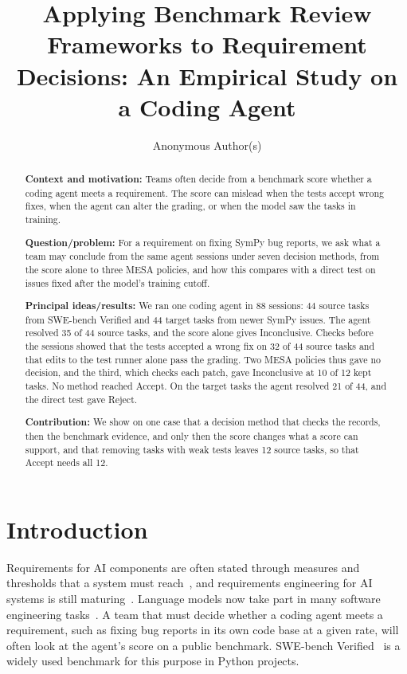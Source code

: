 \documentclass[runningheads]{llncs}
\title{Applying Benchmark Review Frameworks to Requirement Decisions: An Empirical Study on a Coding Agent}
\author{Anonymous Author(s)}
\institute{Submission Under Double-Blind Review}
\begin{document}
\maketitle

\begin{abstract}
\textbf{Context and motivation:} Teams often decide from a benchmark score whether a coding agent meets a requirement. The score can mislead when the tests accept wrong fixes, when the agent can alter the grading, or when the model saw the tasks in training.

\textbf{Question/problem:} For a requirement on fixing SymPy bug reports, we ask what a team may conclude from the same agent sessions under seven decision methods, from the score alone to three MESA policies, and how this compares with a direct test on issues fixed after the model's training cutoff.

\textbf{Principal ideas/results:} We ran one coding agent in 88 sessions: 44 source tasks from SWE-bench Verified and 44 target tasks from newer SymPy issues. The agent resolved 35 of 44 source tasks, and the score alone gives Inconclusive. Checks before the sessions showed that the tests accepted a wrong fix on 32 of 44 source tasks and that edits to the test runner alone pass the grading. Two MESA policies thus gave no decision, and the third, which checks each patch, gave Inconclusive at 10 of 12 kept tasks. No method reached Accept. On the target tasks the agent resolved 21 of 44, and the direct test gave Reject.

\textbf{Contribution:} We show on one case that a decision method that checks the records, then the benchmark evidence, and only then the score changes what a score can support, and that removing tasks with weak tests leaves 12 source tasks, so that Accept needs all 12.
\end{abstract}


\section{Introduction}
Requirements for AI components are often stated through measures and thresholds that a system must reach~\cite{berry_re4ai_2022}, and requirements engineering for AI systems is still maturing~\cite{habiba_re4ai_maturity_2024}. Language models now take part in many software engineering tasks~\cite{hou_llm4se_survey_2024}. A team that must decide whether a coding agent meets a requirement, such as fixing bug reports in its own code base at a given rate, will often look at the agent's score on a public benchmark. SWE-bench Verified~\cite{jimenez_swebench_2024,openai_swebench_verified_2024} is a widely used benchmark for this purpose in Python projects.
\end{document}
